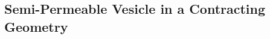 \documentclass[9pt,twocolumn,twoside,lineno]{pnas-new}
\newif\ifTikz
\begin{document}
%
%

\subsection*{Semi-Permeable Vesicle in a Contracting Geometry}



% 
 
\end{document}
